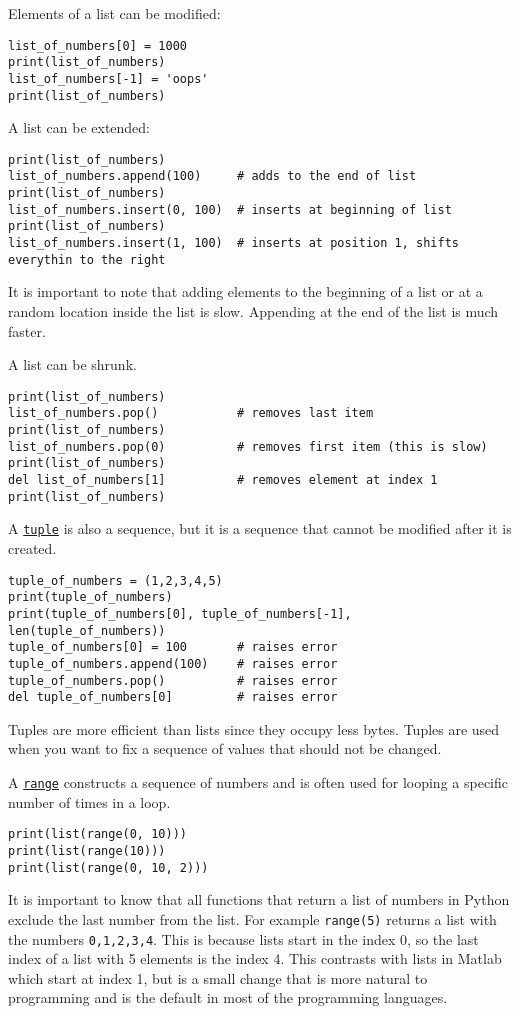 \documentclass[12pt, a4paper]{article}
\begin{document}
Elements of a list can be modified:
\lstset{language=jupyter-python,label= ,caption= ,captionpos=b,numbers=none}
\begin{lstlisting}
list_of_numbers[0] = 1000
print(list_of_numbers)
list_of_numbers[-1] = 'oops'
print(list_of_numbers)
\end{lstlisting}
A list can be extended:
\lstset{language=jupyter-python,label= ,caption= ,captionpos=b,numbers=none}
\begin{lstlisting}
print(list_of_numbers)
list_of_numbers.append(100)     # adds to the end of list
print(list_of_numbers)
list_of_numbers.insert(0, 100)  # inserts at beginning of list
print(list_of_numbers)
list_of_numbers.insert(1, 100)  # inserts at position 1, shifts everythin to the right
\end{lstlisting}
It is important to note that adding elements to the beginning of a list or at a random location inside the list is slow. Appending at the end of the list is much faster.

A list can be shrunk.
\lstset{language=jupyter-python,label= ,caption= ,captionpos=b,numbers=none}
\begin{lstlisting}
print(list_of_numbers)
list_of_numbers.pop()           # removes last item
print(list_of_numbers)
list_of_numbers.pop(0)          # removes first item (this is slow)
print(list_of_numbers)
del list_of_numbers[1]          # removes element at index 1
print(list_of_numbers)
\end{lstlisting}

A \href{https://docs.python.org/3.6/library/stdtypes.html\#tuple}{\texttt{tuple}} is also a sequence, but it is a sequence that cannot be modified after it is created.
\lstset{language=jupyter-python,label= ,caption= ,captionpos=b,numbers=none}
\begin{lstlisting}
tuple_of_numbers = (1,2,3,4,5)
print(tuple_of_numbers)
print(tuple_of_numbers[0], tuple_of_numbers[-1], len(tuple_of_numbers))
tuple_of_numbers[0] = 100       # raises error
tuple_of_numbers.append(100)    # raises error
tuple_of_numbers.pop()          # raises error
del tuple_of_numbers[0]         # raises error
\end{lstlisting}
Tuples are more efficient than lists since they occupy less bytes.
Tuples are used when you want to fix a sequence of values that should not be changed.

A \href{https://docs.python.org/3.6/library/stdtypes.html\#range}{\texttt{range}} constructs a sequence of numbers and is often used for looping a specific number of times in a loop.
\lstset{language=jupyter-python,label= ,caption= ,captionpos=b,numbers=none}
\begin{lstlisting}
print(list(range(0, 10)))
print(list(range(10)))
print(list(range(0, 10, 2)))
\end{lstlisting}
It is important to know that all functions that return a list of numbers in Python exclude the last number from the list. For example \texttt{range(5)} returns a list with the numbers \texttt{0,1,2,3,4}. This is because lists start in the index 0, so the last index of a list with 5 elements is the index 4.
This contrasts with lists in Matlab which start at index 1, but is a small change that is more natural to programming and is the default in most of the programming languages.
\end{document}
